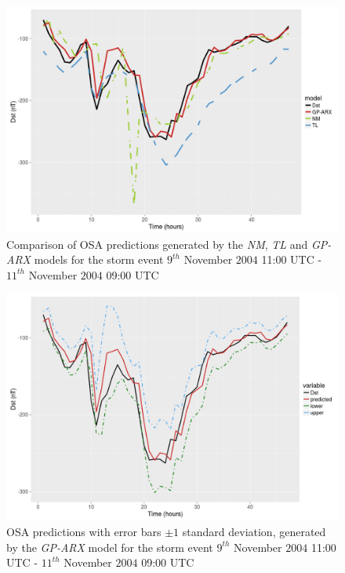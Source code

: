 \documentclass[referee,a4paper,12pt,traditabstract]{swsc}
\begin{document}
\begin{linenumbers}
\begin{figure}
   \centering
   \includegraphics[width=\textwidth]{Compare_pred.png}
      \caption{Comparison of OSA predictions generated by the \emph{NM}, \emph{TL} and \emph{GP-ARX} models for the storm event $9^{th}$ November $2004$ 11:00 UTC - $11^{th}$ November $2004$ 09:00 UTC}
         \label{fig:predictions}
\end{figure}

\begin{figure}
   \centering
   \includegraphics[width=\textwidth]{Compare_pred_err_bar.png}
      \caption{OSA predictions with error bars $\pm 1$ standard deviation, generated by the \emph{GP-ARX} model for the storm event $9^{th}$ November $2004$ 11:00 UTC - $11^{th}$ November $2004$ 09:00 UTC}
         \label{fig:predictionswitherrorbar}
\end{figure}


\end{linenumbers}
\end{document}
